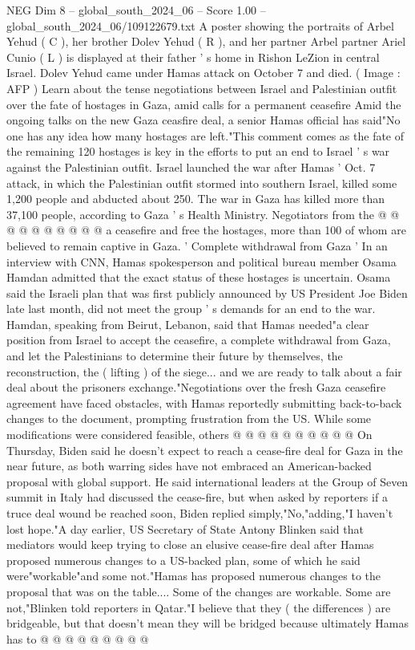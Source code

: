 \begin{textsample}{NEG Dim 8 – global\_south\_2024\_06 – Score 1.00 – global\_south\_2024\_06/109122679.txt}  \label{ex:f8_neg_249}
A poster showing the portraits of Arbel Yehud ( C ), her brother Dolev Yehud ( R ), and her partner Arbel partner Ariel Cunio ( L ) is displayed at their father ' s home in Rishon LeZion in central Israel.
Dolev Yehud came under Hamas attack on October 7 and died. ( Image : AFP ) Learn about the tense negotiations between Israel and Palestinian outfit over the fate of hostages in Gaza, amid calls for a permanent ceasefire Amid the ongoing talks on the new Gaza ceasfire deal, a senior Hamas official has said"No one has any idea how many hostages are left."This comment comes as the fate of the remaining 120 hostages is key in the efforts to put an end to Israel ' s war against the Palestinian outfit.
Israel launched the war after Hamas ' Oct. 7 attack, in which the Palestinian outfit stormed into southern Israel, killed some 1,200 people and abducted about 250.
The war in Gaza has killed more than 37,100 people, according to Gaza ' s Health Ministry.
Negotiators from the @ @ @ @ @ @ @ @ @ @ a ceasefire and free the hostages, more than 100 of whom are believed to remain captive in Gaza. ' Complete withdrawal from Gaza ' In an interview with CNN, Hamas spokesperson and political bureau member Osama Hamdan admitted that the exact status of these hostages is uncertain.
Osama said the Israeli plan that was first publicly announced by US President Joe Biden late last month, did not meet the group ' s demands for an end to the war.
Hamdan, speaking from Beirut, Lebanon, said that Hamas needed"a clear position from Israel to accept the ceasefire, a complete withdrawal from Gaza, and let the Palestinians to determine their future by themselves, the reconstruction, the ( lifting ) of the siege... and we are ready to talk about a fair deal about the prisoners exchange."Negotiations over the fresh Gaza ceasefire agreement have faced obstacles, with Hamas reportedly submitting back-to-back changes to the document, prompting frustration from the US.
While some modifications were considered feasible, others @ @ @ @ @ @ @ @ @ @ On Thursday, Biden said he doesn't expect to reach a cease-fire deal for Gaza in the near future, as both warring sides have not embraced an American-backed proposal with global support.
He said international leaders at the Group of Seven summit in Italy had discussed the cease-fire, but when asked by reporters if a truce deal wound be reached soon, Biden replied simply,"No,"adding,"I haven't lost hope."A day earlier, US Secretary of State Antony Blinken said that mediators would keep trying to close an elusive cease-fire deal after Hamas proposed numerous changes to a US-backed plan, some of which he said were"workable"and some not."Hamas has proposed numerous changes to the proposal that was on the table....
Some of the changes are workable.
Some are not,"Blinken told reporters in Qatar."I believe that they ( the differences ) are bridgeable, but that doesn't mean they will be bridged because ultimately Hamas has to @ @ @ @ @ @ @ @ @

\end{textsample}
